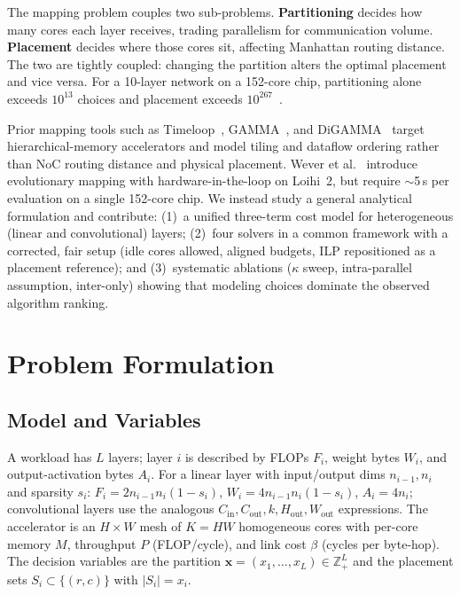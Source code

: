 \documentclass[conference]{IEEEtran}
\begin{document}
The mapping problem couples two sub-problems. \textbf{Partitioning} decides how many cores each layer receives, trading parallelism for communication volume. \textbf{Placement} decides where those cores sit, affecting Manhattan routing distance. The two are tightly coupled: changing the partition alters the optimal placement and vice versa. For a 10-layer network on a 152-core chip, partitioning alone exceeds $10^{13}$ choices and placement exceeds $10^{267}$~\cite{wever2026}.

Prior mapping tools such as Timeloop~\cite{parashar2019}, GAMMA~\cite{kao2020}, and DiGAMMA~\cite{kao2022} target hierarchical-memory accelerators and model tiling and dataflow ordering rather than NoC routing distance and physical placement. Wever et al.~\cite{wever2026} introduce evolutionary mapping with hardware-in-the-loop on Loihi~2, but require $\sim$5\,s per evaluation on a single 152-core chip. We instead study a general analytical formulation and contribute: (1)~a unified three-term cost model for heterogeneous (linear and convolutional) layers; (2)~four solvers in a common framework with a corrected, fair setup (idle cores allowed, aligned budgets, ILP repositioned as a placement reference); and (3)~systematic ablations ($\kappa$ sweep, intra-parallel assumption, inter-only) showing that modeling choices dominate the observed algorithm ranking.

\section{Problem Formulation}
\subsection{Model and Variables}
A workload has $L$ layers; layer $i$ is described by FLOPs $F_i$, weight bytes $W_i$, and output-activation bytes $A_i$. For a linear layer with input/output dims $n_{i-1},n_i$ and sparsity $s_i$: $F_i=2n_{i-1}n_i(1{-}s_i)$, $W_i=4n_{i-1}n_i(1{-}s_i)$, $A_i=4n_i$; convolutional layers use the analogous $C_{\text{in}},C_{\text{out}},k,H_{\text{out}},W_{\text{out}}$ expressions. The accelerator is an $H{\times}W$ mesh of $K{=}HW$ homogeneous cores with per-core memory $M$, throughput $P$ (FLOP/cycle), and link cost $\beta$ (cycles per byte-hop). The decision variables are the partition $\mathbf{x}=(x_1,\dots,x_L)\in\mathbb{Z}_+^L$ and the placement sets $S_i\subset\{(r,c)\}$ with $|S_i|=x_i$.
\end{document}
